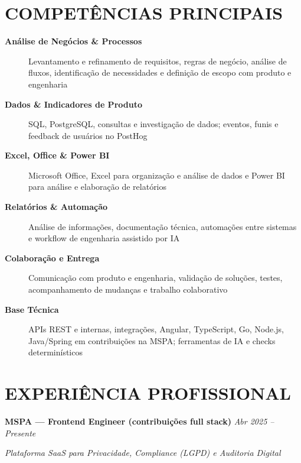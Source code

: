 \documentclass[10pt,a4paper]{article}
\begin{document}
\section*{COMPETÊNCIAS PRINCIPAIS}

\footnotesize

\begin{description}
    \item[\textbf{Análise de Negócios \& Processos}]
    Levantamento e refinamento de requisitos, regras de negócio, análise de fluxos, identificação de necessidades e definição de escopo com produto e engenharia

    \item[\textbf{Dados \& Indicadores de Produto}]
    SQL, PostgreSQL, consultas e investigação de dados; eventos, funis e feedback de usuários no PostHog

    \item[\textbf{Excel, Office \& Power BI}]
    Microsoft Office, Excel para organização e análise de dados e Power BI para análise e elaboração de relatórios

    \item[\textbf{Relatórios \& Automação}]
    Análise de informações, documentação técnica, automações entre sistemas e workflow de engenharia assistido por IA

    \item[\textbf{Colaboração e Entrega}]
    Comunicação com produto e engenharia, validação de soluções, testes, acompanhamento de mudanças e trabalho colaborativo

    \item[\textbf{Base Técnica}]
    APIs REST e internas, integrações, Angular, TypeScript, Go, Node.js, Java/Spring em contribuições na MSPA; ferramentas de IA e checks determinísticos
\end{description}


\section*{EXPERIÊNCIA PROFISSIONAL}

\noindent
\textbf{MSPA — Frontend Engineer (contribuições full stack)}
\hfill
\textit{Abr 2025 -- Presente}

\textit{Plataforma SaaS para Privacidade, Compliance (LGPD) e Auditoria Digital}
\end{document}
